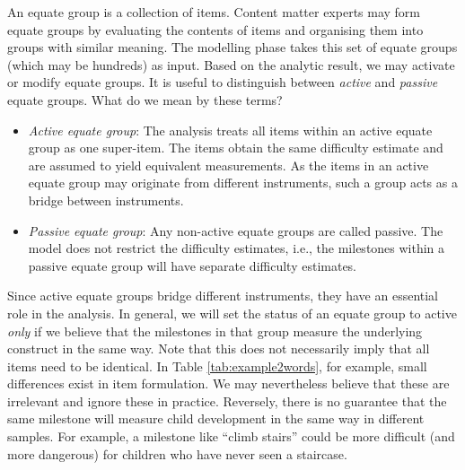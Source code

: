 \documentclass[
]{book}
\providecommand{\tightlist}{%
  \setlength{\itemsep}{0pt}\setlength{\parskip}{0pt}}
\begin{document}
An equate group is a collection of items. Content matter experts may form equate groups by evaluating the contents of items and organising them into groups with similar meaning. The modelling phase takes this set of equate groups (which may be hundreds) as input. Based on the analytic result, we may activate or modify equate groups. It is useful to distinguish between \emph{active} and \emph{passive} equate groups. What do we mean by these terms?

\begin{itemize}
\tightlist
\item
  \emph{Active equate group}: The analysis treats all items within an active equate group as one super-item. The items obtain the same difficulty estimate and are assumed to yield equivalent measurements. As the items in an active equate group may originate from different instruments, such a group acts as a bridge between instruments.
\item
  \emph{Passive equate group}: Any non-active equate groups are called passive. The model does not restrict the difficulty estimates, i.e., the milestones within a passive equate group will have separate difficulty estimates.
\end{itemize}

Since active equate groups bridge different instruments, they have an essential role in the analysis. In general, we will set the status of an equate group to active \emph{only} if we believe that the milestones in that group measure the underlying construct in the same way. Note that this does not necessarily imply that all items need to be identical. In Table \ref{tab:example2words}, for example, small differences exist in item formulation. We may nevertheless believe that these are irrelevant and ignore these in practice. Reversely, there is no guarantee that the same milestone will measure child development in the same way in different samples. For example, a milestone like ``climb stairs'' could be more difficult (and more dangerous) for children who have never seen a staircase.
\end{document}
